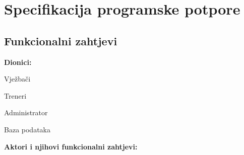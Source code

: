 \chapter{Specifikacija programske potpore}
		
	\section{Funkcionalni zahtjevi}
			
		
			
			
			\noindent \textbf{Dionici:}
			
			\begin{packed_enum}
				
				\item Vježbači
				\item Treneri			
				\item Administrator
				\item Baza podataka
				
			\end{packed_enum}
			
			\noindent \textbf{Aktori i njihovi funkcionalni zahtjevi:}
			
